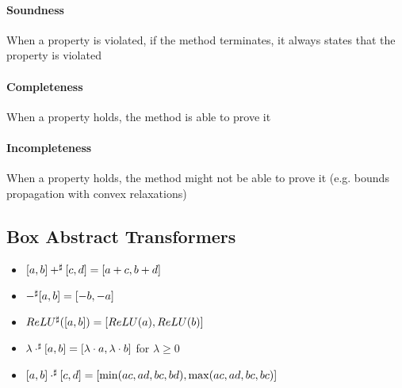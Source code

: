 \paragraph{Soundness} When a  property is violated, if the method terminates, it always states that the property is violated
\paragraph{Completeness} When a property holds, the method is able to prove it
\paragraph{Incompleteness} When a property holds, the method might not be able to prove it (e.g. bounds propagation with convex relaxations)
\subsection*{Box Abstract Transformers}
\begin{itemize}
    \item $[a, b] +^{\sharp} [c, d] = [a+c, b+d]$
    \item $-^{\sharp} [a, b] = [-b, -a]$
    \item $ReLU^{\sharp}([a, b]) = [ReLU(a), ReLU(b)]$
    \item $\lambda \cdot^{\sharp} [a, b] = [\lambda \cdot a, \lambda \cdot b]$ for $\lambda \ge 0$
    \item $[a, b] \cdot^{\sharp} [c, d] = [\min(ac, ad, bc, bd), \max(ac, ad, bc, bc)]$
\end{itemize}

